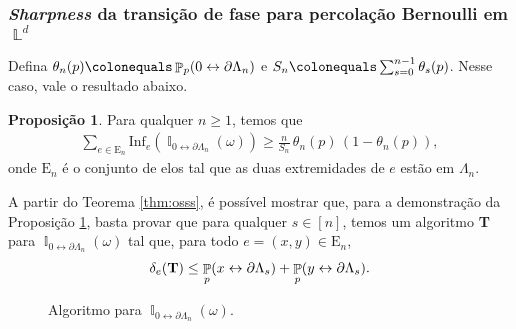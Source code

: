 \documentclass[9pt]{beamer}
\theoremstyle{definition} %
\newtheorem{mypro}{Proposição}
\DeclareMathOperator{\PX}{\mathbb{P}} %
\DeclareMathOperator{\IX}{\mathbb{I}} %
\DeclareMathOperator{\LX}{\mathbb{L}} %
\begin{document}
	\begin{frame}[t]
		\frametitle{\textit{Sharpness} da transição de fase para percolação Bernoulli em $\LX^d$}
		Defina $\theta_n(p) \colonequals \PX_p(0 \leftrightarrow \partial\Lambda_n)$ e $S_n \colonequals \sum_{s = 0}^{n-1}\theta_s(p)$. Nesse caso, vale o resultado abaixo.
		\begin{mypro}\label{prop:decai-exp}
			Para qualquer $n \geq 1$, temos que
			\begin{align*}
			\sum_{e \in \text{E}_n} \text{Inf}_e(\IX_{0\leftrightarrow\partial\Lambda_n}(\omega)) \geq \frac{n}{S_n} \, \theta_n(p) \, (1 - \theta_n(p)),
			\end{align*}
			onde $\text{E}_n$ é o conjunto de elos tal que as duas extremidades de $e$ estão em $\Lambda_n$.
		\end{mypro}
		\vspace{-3pt}
		\begin{minipage}[t]{0.55 \textwidth}
			A partir do Teorema \ref{thm:osss}, é possível mostrar que, para a demonstração da Proposição \ref{prop:decai-exp}, basta provar que para qualquer $s \in [n]$, temos um algoritmo \textbf{T} para $\IX_{0\leftrightarrow\partial\Lambda_n}(\omega)$ tal que, para todo $e = (x, y) \in \text{E}_n$,
			\begin{align*}
			\delta_e(\text{\textbf{T}}) \leq \PX_p(x \leftrightarrow \partial\Lambda_s) + \PX_p(y \leftrightarrow \partial\Lambda_s).
			\end{align*}
		\end{minipage}\pause
		\begin{minipage}[t]{0.45 \textwidth}
			\begin{figure}
				
				\vspace{-9pt}
				\caption{\justifying Algoritmo  para $\IX_{0\leftrightarrow\partial\Lambda_n}(\omega)$.}
				\label{fig:caixa-k}
			\end{figure}
		\end{minipage}
	\end{frame}
\end{document}
